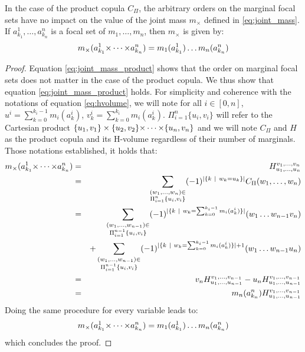
In the case of the product copula $C_\Pi$, the arbitrary orders on the marginal focal sets have no impact on the value of the joint mass $m_\times$ defined in \eqref{eq:joint_mass}. If $a^1_{k_1},\dots,a^n_{k_n}$ is a focal set of $m_1,\dots,m_n$, then $m_\times$ is given by:
\begin{eqnarray}\label{eq:joint_mass_product}
    m_\times(a^1_{k_1}{\times\dots\times} a^n_{k_n}) = m_1(a^1_{k_1})\dots m_n(a^n_{k_n})
\end{eqnarray}

\begin{proof}
    Equation \eqref{eq:joint_mass_product} shows that the order on marginal focal sets does not matter in the case of the product copula. We thus show that equation \eqref{eq:joint_mass_product} holds.
    For simplicity and coherence with the notations of equation \eqref{eq:hvolume}, we will note for all $i\in[0,n]$, $u^i=\sum_{k=0}^{k_i-1}m_i(a_k^i)$, $v^i_k=\sum_{k=0}^{k_i}m_i(a_k^i)$. $\Pi_{i=1}^n\{u_i, v_i\}$ will refer to the Cartesian product $\{u_1, v_1\}\times\{u_2, v_2\}{\times\dots\times}\{u_n, v_n\}$ and we will note $C_\Pi$ and $H$ as the product copula and its H-volume regardless of their number of marginals. Those notations established, it holds that:
    \begin{eqnarray*}
        m_\times(a^1_{k_1}{\times\dots\times} a^{n}_{k_{n}}) &=& H_{u_1, \dots, u_{n}}^{v_1, \dots, v_{n}}\\
        &=&\sum_{\substack{(w_1, \dots, w_{n})\in\\\Pi_{i=1}^{n}\{u_i, v_i\}}}(-1)^{|\{k~|~w_k=u_k\}|}C_\Pi(w_1, \dots, w_{n})\\
        &=&\sum_{\substack{(w_1, \dots, w_{n-1})\in\\\Pi_{i=1}^{n-1}\{u_i, v_i\}}}(-1)^{|\{k~|~w_k=\sum_{k=0}^{k_i-1}m_i(a^i_k)\}|}(w_1 \dots w_{n-1}v_{n})\\
        && + \sum_{\substack{(w_1, \dots, w_{n-1})\in\\\Pi_{i=1}^{n-1}\{u_i, v_i\}}}(-1)^{|\{k~|~w_k=\sum_{k=0}^{k_i-1}m_i(a^i_k)\}|+1}(w_1 \dots w_{n-1}u_n)\\
        &=& v_{n}H_{u_1, \dots, u_{n-1}}^{v_1, \dots, v_{n-1}} - u_{n}H_{u_1, \dots, u_{n-1}}^{v_1, \dots, v_{n-1}}\\
        &=& m_{n}(a^{n}_{k_{n}})H_{u_1, \dots, u_{n-1}}^{v_1, \dots, v_{n-1}}
    \end{eqnarray*}
    Doing the same procedure for every variable leads to:
    \begin{eqnarray*}
        m_\times(a^1_{k_1}{\times\dots\times} a^n_{k_n}) = m_1(a^1_{k_1})\dots m_n(a^n_{k_n})
    \end{eqnarray*}
    which concludes the proof.
\end{proof}

